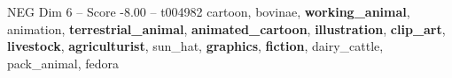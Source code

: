 \begin{textsample}{NEG Dim 6 – Score -8.00 – t004982}  \label{ex:f6_neg_026}
cartoon, bovinae, \textbf{working\_animal}, animation, \textbf{terrestrial\_animal}, \textbf{animated\_cartoon}, \textbf{illustration}, \textbf{clip\_art}, \textbf{livestock}, \textbf{agriculturist}, sun\_hat, \textbf{graphics}, \textbf{fiction}, dairy\_cattle, pack\_animal, fedora

\end{textsample}
